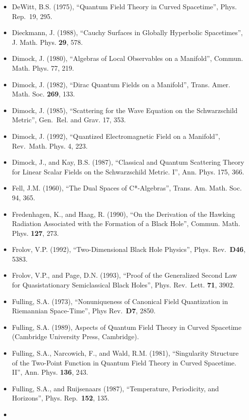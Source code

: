 \documentclass[11pt,a4paper]{article}
\providecommand{\tightlist}{\setlength{\itemsep}{0pt}\setlength{\parskip}{0pt}}
\begin{document}
\begin{itemize}
\tightlist
\item
  DeWitt, B.S. (1975), ``Quantum Field Theory in Curved Spacetime'', Phys. Rep.~19, 295.
\item
  Dieckmann, J. (1988), ``Cauchy Surfaces in Globally Hyperbolic Spacetimes'', J. Math. Phys. \textbf{29}, 578.
\item
  Dimock, J. (1980), ``Algebras of Local Observables on a Manifold'', Commun. Math. Phys. 77, 219.
\item
  Dimock, J. (1982), ``Dirac Quantum Fields on a Manifold'', Trans. Amer. Math. Soc. \textbf{269}, 133.
\item
  Dimock, J. (1985), ``Scattering for the Wave Equation on the Schwarzschild Metric'', Gen.~Rel. and Grav. 17, 353.
\item
  Dimock, J. (1992), ``Quantized Electromagnetic Field on a Manifold'', Rev.~Math. Phys. 4, 223.
\item
  Dimock, J., and Kay, B.S. (1987), ``Classical and Quantum Scattering Theory for Linear Scalar Fields on the Schwarzschild Metric. I'', Ann. Phys. 175, 366.
\item
  Fell, J.M. (1960), ``The Dual Spaces of C*-Algebras'', Trans. Am. Math. Soc. 94, 365.
\item
  Fredenhagen, K., and Haag, R. (1990), ``On the Derivation of the Hawking Radiation Associated with the Formation of a Black Hole'', Commun. Math. Phys. \textbf{127}, 273.
\item
  Frolov, V.P. (1992), ``Two-Dimensional Black Hole Physics'', Phys. Rev.~\textbf{D46}, 5383.
\item
  Frolov, V.P., and Page, D.N. (1993), ``Proof of the Generalized Second Law for Quasistationary Semiclassical Black Holes'', Phys. Rev.~Lett. \textbf{71}, 3902.
\item
  Fulling, S.A. (1973), ``Nonuniqueness of Canonical Field Quantization in Riemannian Space-Time'', Phys Rev.~\textbf{D7}, 2850.
\item
  Fulling, S.A. (1989), Aspects of Quantum Field Theory in Curved Spacetime (Cambridge University Press, Cambridge).
\item
  Fulling, S.A., Narcowich, F., and Wald, R.M. (1981), ``Singularity Structure of the Two-Point Function in Quantum Field Theory in Curved Spacetime. II'', Ann. Phys. \textbf{136}, 243.
\item
  Fulling, S.A., and Ruijsenaars (1987), ``Temperature, Periodicity, and Horizons'', Phys. Rep.~\textbf{152}, 135.
\item

\end{itemize}
\end{document}
